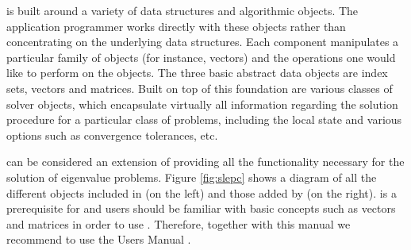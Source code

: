 	\petsc is built around a variety of data structures and algorithmic objects. The application programmer works directly with these objects rather than concentrating on the underlying data structures. Each component manipulates a particular family of objects (for instance, vectors) and the operations one would like to perform on the objects. The three basic abstract data objects are index sets, vectors and matrices. Built on top of this foundation are various classes of solver objects, which encapsulate virtually all information regarding the solution procedure for a particular class of problems, including the local state and various options such as convergence tolerances, etc. 

	\slepc can be considered an extension of \petsc providing all the functionality necessary for the solution of eigenvalue problems. Figure \ref{fig:slepc} shows a diagram of all the different objects included in \petsc (on the left) and those added by \slepc (on the right). \petsc is a prerequisite for \slepc and users should be familiar with basic concepts such as vectors and matrices in order to use \slepc. Therefore, together with this manual we recommend to use the \petsc Users Manual \citep{Balay:2013:PUM}.


